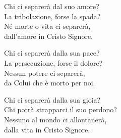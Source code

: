 
\strofa Chi ci separerà dal suo amore?\\
La tribolazione, forse la spada?\\
Né morte o vita ci separerà,\\
dall'amore in Cristo Signore.

\spazio

\strofa Chi ci separerà dalla sua pace?\\
La persecuzione, forse il dolore?\\
Nessun potere ci separerà,\\
da Colui che è morto per noi.

\spazio

\strofa Chi ci separerà dalla sua gioia?\\
Chi potrà strapparci il suo perdono?\\
Nessuno al mondo ci allontanerà,\\
dalla vita in Cristo Signore.
